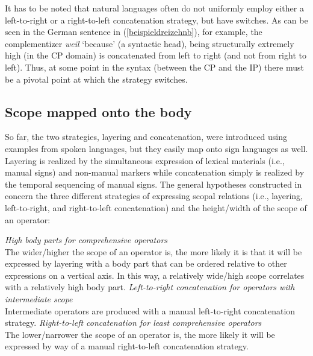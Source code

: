 \noindent It has to be noted that natural languages often do not uniformly employ either a left-to-right or a right-to-left concatenation strategy, but have switches. As can be seen in the German sentence in (\ref{beispieldreizehnb}), for example, the complementizer \textit{weil} `because' (a syntactic head), being structurally extremely high (in the CP domain) is concatenated from left to right (and not from right to left). Thus, at some point in the syntax (between the CP and the IP) there must be a pivotal point at which the strategy switches. 

\subsection{Scope mapped onto the body}
So far, the two strategies, layering and concatenation, were introduced using examples from spoken languages, but they easily map onto sign languages as well. Layering is realized by the simultaneous expression of lexical materials (i.e., manual signs) and non-manual markers while concatenation simply is realized by the temporal sequencing of manual signs. The general hypotheses constructed in \citet[14]{bross2017scope} concern the three different strategies of expressing scopal relations (i.e., layering, left-to-right, and right-to-left concatenation) and the height/width of the scope of an operator:



\begin{exe} 
\ex \label{hypohypo} 
\begin{xlist} 
\ex \textit{High body parts for comprehensive operators} \\
The wider/higher the scope of an operator is, the more likely it is that it will be expressed by layering with a body part that can be ordered relative to other expressions on a vertical axis. In this way, a relatively wide/high scope correlates with a relatively high body part.   \label{hypothesisa}
\ex \textit{Left-to-right concatenation for operators with intermediate scope}\\
Intermediate operators are produced with a manual left-to-right concatenation strategy.  \label{hypothesisb} 
\ex  \textit{Right-to-left concatenation for least comprehensive operators} \\
The lower/narrower the scope of an operator is, the more likely it will be expressed by way of a manual right-to-left concatenation strategy. \label{hypothesisc}
\end{xlist} 
\end{exe}


